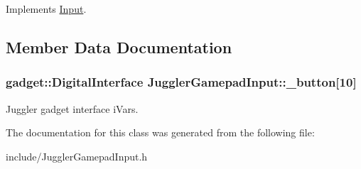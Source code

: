 Implements \hyperlink{class_input_ab927e3b2f1735052f6f1ef3f3bf7b29c}{Input}.

\subsection{Member Data Documentation}
\hypertarget{class_juggler_gamepad_input_acfc23ac6b059957adc88546a588769ae}{
\subsubsection[{\_\-button}]{\setlength{\rightskip}{0pt plus 5cm}gadget::DigitalInterface {\bf JugglerGamepadInput::\_\-button}\mbox{[}10\mbox{]}}}
\label{class_juggler_gamepad_input_acfc23ac6b059957adc88546a588769ae}
Juggler gadget interface iVars. 

The documentation for this class was generated from the following file:\begin{DoxyCompactItemize}
\item 
include/JugglerGamepadInput.h\end{DoxyCompactItemize}
